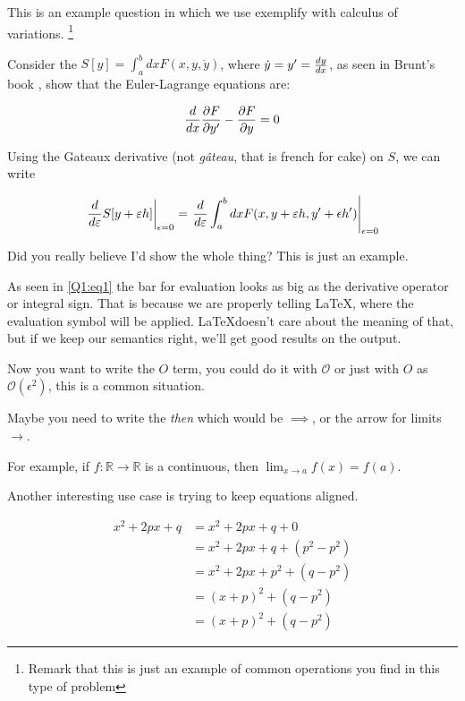 
This is an example question in which we use exemplify with calculus of variations.
\footnote{Remark that this is just an example of common operations you find in this type of problem}

Consider the $S[y] = \int_a^b dx F(x, y, \dot{y})$, where $\dot{y} = y^{\prime} = \frac{d y}{d x}$, as seen in Brunt's book
\cite{bruntVariations}, show that the Euler-Lagrange equations are:

%
%
\begin{equation*}
\frac{d }{d x}\frac{\partial F}{\partial y^\prime} - \frac{\partial F}{\partial y} = 0
\end{equation*}

\begin{solution}
Using the Gateaux derivative (not \emph{gâteau}, that is french for cake) on $S$, we can write

\begin{equation}
\label{Q1:eq1}
\left.
\frac{d }{d \varepsilon} S[y + \varepsilon h] \right|_{\epsilon = 0}
= 
\left.
\frac{d }{d \varepsilon} \int_a^b dx F(x, y + \varepsilon h, y^\prime + \epsilon h^\prime) \right|_{\epsilon = 0}
\end{equation}

Did you really believe I'd show the whole thing? This is just an example.

As seen in \ref{Q1:eq1} the bar for evaluation looks as big as the derivative operator or integral sign. That is because we are properly telling \LaTeX, where the evaluation symbol will be applied. \LaTeX doesn't care about the meaning of that, but if we keep our semantics right, we'll get good results on the output.

Now you want to write the $O$ term, you could do it with $\mathcal{O}$ or just with $O$ as $\mathcal{O}(\epsilon^2)$, this is a common situation.


Maybe you need to write the \emph{then} which would be $\implies$, or the arrow for limits $\to$.

For example, if $f: \mathbb{R} \to \mathbb{R}$ is a continuous, then $\lim_{x \to a} f(x) = f(a)$.

Another interesting use case is trying to keep equations aligned.

\begin{align*}
    x^2 + 2px + q &= x^2 + 2p x + q + 0 \\
    &= x^2 + 2p x + q + (p^2 - p^2) \\
    &= x^2 + 2p x + p^2  + (q - p^2) \\
    &= (x + p)^2 + (q - p^2) \\
    &= (x + p)^2 + (q - p^2)
\end{align*}


\end{solution}
